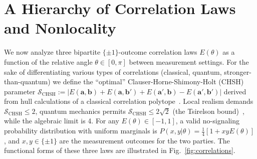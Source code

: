 \documentclass[%
  reprint,
  showpacs,
  showkeys,
  pra,
  longbibliography,
  floatfix,
  x11names
]{revtex4-2}
\begin{document}
\section{A Hierarchy of Correlation Laws and Nonlocality}
We now analyze three bipartite $\{\pm1\}$-outcome correlation laws $E(\theta)$ as a function of the relative angle $\theta \in [0, \pi]$ between measurement settings.
For the sake of differentiating various types of correlations (classical, quantum, stronger-than-quantum) we define the ``optimal'' Clauser-Horne-Shimony-Holt (CHSH) parameter
$\mathcal{S}_{\mathrm{CHSH}} := |E(\mathbf{a},\mathbf{b}) + E(\mathbf{a},\mathbf{b}') + E(\mathbf{a}',\mathbf{b}) - E(\mathbf{a}',\mathbf{b}')|$
derived from hull calculations of a classical correlation polytope~\cite{froissart-81,pitowsky-86}. Local realism demands $\mathcal{S}_{\mathrm{CHSH}} \le 2$, quantum mechanics permits $\mathcal{S}_{\mathrm{CHSH}} \le 2\sqrt{2}$ (the Tsirelson bound)~\cite{cirelson:80}, while the algebraic limit is 4. For any $E(\theta) \in [-1, 1]$, a valid no-signaling probability distribution with uniform marginals is $P(x,y|\theta) = \frac{1}{4}[1 + xy E(\theta)]$, and $x, y \in \{\pm1\}$ are the measurement outcomes for the two parties.
The functional forms of these three laws are illustrated in Fig.~\ref{fig:correlations}.
\end{document}
